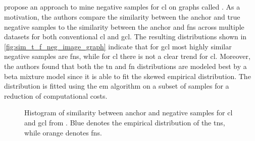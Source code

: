 \subsection{\progcl{}}\label{subsec:progcl}

\citeauthor{progcl_2022} propose an approach to mine negative samples for \ac{cl} on graphs called \progcl{}. 
As a motivation, the authors compare the similarity between the anchor and true negative samples to the similarity between the anchor and \acp{fn} 
across multiple datasets for both conventional \ac{cl} and \ac{gcl}.
The resulting distributions shown in \autoref{fig:sim_t_f_neg_image_graph} 
indicate that for \ac{gcl} most highly similar negative samples are \acp{fn}, while for \ac{cl} there is not a clear trend for \ac{cl}.
Moreover, the authors found that both the \ac{tn} and \ac{fn} distributions are modeled best by a beta mixture model %
since it is able to fit the skewed empirical distribution.
The distribution is fitted using the \ac{em} algorithm on a subset of samples for a reduction of computational costs.

\begin{figure}%
    \centering
    \qquad
    \caption{Histogram of similarity between anchor and negative samples for \ac{cl} and \ac{gcl} from \citet{progcl_2022}.
    Blue denotes the empirical distribution of the \acp{tn}, while orange denotes \acp{fn}.}%
    \label{fig:sim_t_f_neg_image_graph}%
\end{figure}

